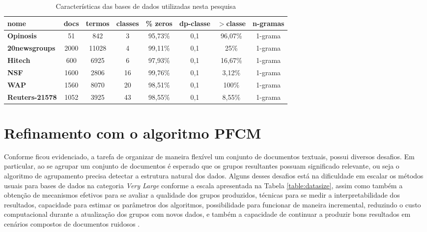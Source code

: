 \begin{table}[!htp]
  \centering
  \begin{tabular}{ |l|c c c c c c c|}
    \hline
    {\bf nome} & docs & termos & classes & \% zeros & dp-classe & $>$classe & n-gramas \\
    \hline
    {\bf Opinosis} & 51 & 842 & 3 & 95,73\% & 0,1 & 96,07\% & 1-grama \\
    \hline
    {\bf 20newsgroups} & 2000 & 11028 & 4 & 99,11\% & 0,1 & 25\% & 1-grama \\
    \hline
    {\bf Hitech} & 600 & 6925 & 6 & 97,93\% & 0,1 & 16,67\% & 1-grama \\
    \hline
    {\bf NSF} & 1600 & 2806 & 16 & 99,76\% & 0,1 & 3,12\% & 1-grama \\
    \hline
    {\bf WAP} & 1560 & 8070 & 20 & 98,51\% & 0,1 & 100\% & 1-grama \\
    \hline
    {\bf Reuters-21578} & 1052 & 3925 & 43 & 98,55\% & 0,1 & 8,55\% & 1-grama \\
    \hline
  \end{tabular}
  \caption{Características das bases de dados utilizadas nesta pesquisa}
  \label{table:datasets}
\end{table}

\section{Refinamento com o algoritmo PFCM}

Conforme ficou evidenciado, a tarefa de organizar de maneira flexível um conjunto de documentos
textuais, possui diversos desafios. Em particular, ao se agrupar um conjunto de documentos é
esperado que os grupos resultantes possuam significado relevante, ou seja o algoritmo de
agrupamento precisa detectar a estrutura natural dos dados\cite{Steinbach2004}. Alguns desses 
desafios está na dificuldade em escalar os métodos usuais para bases de dados na categoria {\it Very Large}
conforme a escala apresentada na Tabela \ref{table:datasize}, assim como também a obtenção de
mecanismos efetivos para se avaliar a qualidade dos grupos produzidos, técnicas para se medir a
interpretabilidade dos resultados, capacidade para estimar os parâmetros dos algoritmos,
possibilidade para funcionar de maneira incremental, reduzindo o custo computacional durante a
atualização dos grupos com novos dados, e também a capacidade de continuar a produzir bons
resultados em cenários compostos de documentos ruidosos \cite{Carvalho2016}. 

